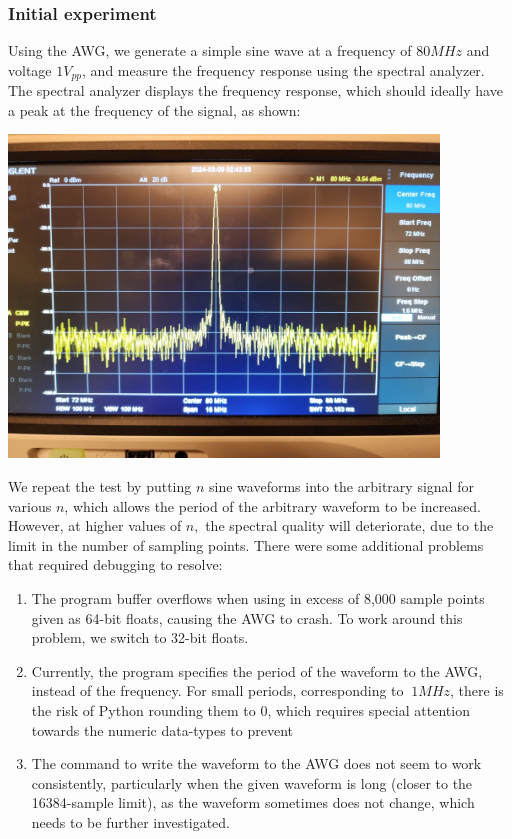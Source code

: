\documentclass{article}
\begin{document}
    \subsubsection*{Initial experiment}
    Using the AWG, we generate a simple sine wave at a frequency of $80MHz$ and voltage $1V_{pp}$, and measure the frequency response using the spectral analyzer. The spectral analyzer displays the frequency response, which should ideally have a peak at the frequency of the signal, as shown:
    \begin{mdframed}[backgroundcolor=gray!20, align = center, userdefinedwidth = 4.8in]
    \includegraphics[width = 4.5in]{img/spectralAnalyzer.jpg}
    \end{mdframed}
    We repeat the test by putting $n$ sine waveforms into the arbitrary signal for various $n$, which allows the period of the arbitrary waveform to be increased. However, at higher values of $n,$ the spectral quality will deteriorate, due to the limit in the number of sampling points. There were some additional problems that required debugging to resolve:
    \begin{enumerate}
    \item The program buffer overflows when using in excess of 8,000 sample points given as 64-bit floats, causing the AWG to crash. To work around this problem, we switch to 32-bit floats.
    \item Currently, the program specifies the period of the waveform to the AWG, instead of the frequency. For small periods, corresponding to $~1MHz$, there is the risk of Python rounding them to 0, which requires special attention towards the numeric data-types to prevent
    \item The command to write the waveform to the AWG does not seem to work consistently, particularly when the given waveform is long (closer to the 16384-sample limit), as the waveform sometimes does not change, which needs to be further investigated.
    \end{enumerate}
\end{document}
